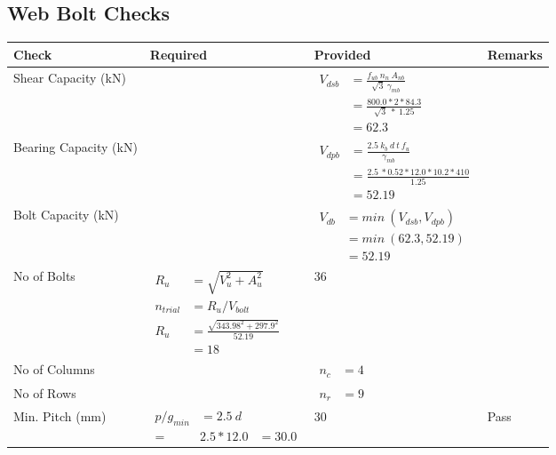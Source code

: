 \documentclass{article}%
\begin{document}
\subsection{Web Bolt Checks}%
\label{subsec:WebBoltChecks}%
\renewcommand{\arraystretch}{1.2}%
\begin{longtable}{|p{4cm}|p{5cm}|p{6.5cm}|p{1.5cm}|}%
\hline%
\rowcolor{OsdagGreen}%
Check&Required&Provided&Remarks\\%
\hline%
\endhead%
\hline%
Shear Capacity (kN)&&$\begin{aligned}V_{dsb} &= \frac{f_{ub} ~n_n~ A_{nb}}{\sqrt{3} ~\gamma_{mb}}\\ &= \frac{800.0*2*84.3}{\sqrt{3}~*~1.25}\\ &= 62.3\end{aligned}$&\\%
\hline%
Bearing Capacity (kN)&&$\begin{aligned}V_{dpb} &= \frac{2.5~ k_b~ d~ t~ f_u}{\gamma_{mb}}\\ &= \frac{2.5~*0.52*12.0*10.2*410}{1.25}\\ &=52.19\end{aligned}$&\\%
\hline%
Bolt Capacity (kN)&&$\begin{aligned}V_{db} &= min~ (V_{dsb}, V_{dpb})\\ &= min~ (62.3,52.19)\\ &=52.19\end{aligned}$&\\%
\hline%
No of Bolts&$\begin{aligned}R_{u} &= \sqrt{V_u^2+A_u^2}\\ n_{trial} &= R_u/ V_{bolt}\\ R_{u} &= \frac{\sqrt{343.98^2+297.9^2}}{52.19}\\ &=18\end{aligned}$&36&\\%
\hline%
No of Columns&&$\begin{aligned} n_c &=4 \end{aligned}$&\\%
\hline%
No of Rows&&$\begin{aligned} n_r &=9 \end{aligned}$&\\%
\hline%
Min. Pitch (mm)&$\begin{aligned}p/g_{min}&= 2.5 ~ d&\\ =&2.5*12.0&=30.0\end{aligned}$&30&Pass\\%
\hline%

\end{longtable}
\end{document}
